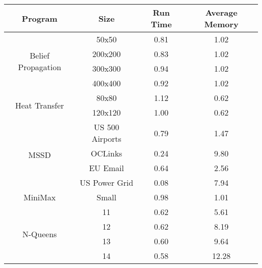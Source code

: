 \begin{tabular}{c | c || c | c} \hline
	\textbf{Program} & \textbf{Size} & \textbf{Run Time} & \textbf{Average Memory}\\ \hline \hline
	\multirow{4}{*}{Belief Propagation}  & 50x50 &  0.81  &  1.02
  \\
		 & 200x200 &  0.83  &  1.02
  \\
		 & 300x300 &  0.94  &  1.02
  \\
		 & 400x400 &  0.92  &  1.02
  \\
	\hline
	\multirow{2}{*}{Heat Transfer}  & 80x80 &  1.12  &  0.62
  \\
		 & 120x120 &  1.00  &  0.62
  \\
	\hline
	\multirow{4}{*}{MSSD}  & US 500 Airports &  0.79  &  1.47
  \\
		 & OCLinks &  0.24  &  9.80
  \\
		 & EU Email &  0.64  &  2.56
  \\
		 & US Power Grid &  0.08  &  7.94
  \\
	\hline
	MiniMax  & Small &  0.98  &  1.01
  \\
	\hline
	\multirow{4}{*}{N-Queens}  & 11 &  0.62  &  5.61
  \\
		 & 12 &  0.62  &  8.19
  \\
		 & 13 &  0.60  &  9.64
  \\
		 & 14 &  0.58  &  12.28
  \\
	\hline
\end{tabular}

